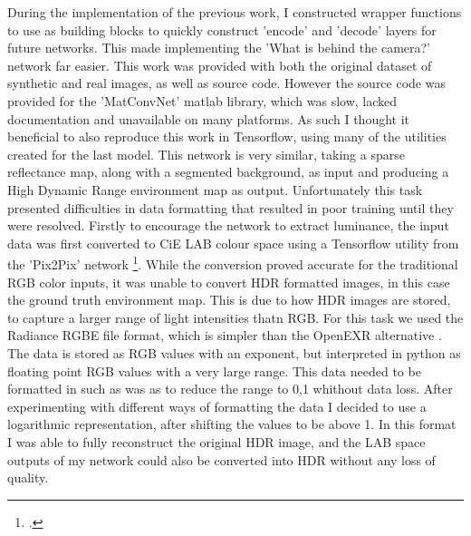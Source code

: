 \documentclass[ %
                    author={Gavin Parker},
                supervisor={Dr. Neill Campbell},
                    degree={MEng},
                     title={Deep Siamese Networks for Illumination Estimation from Stereo Images},
                  subtitle={},
                      type={research},
                      year={2018} ]{dissertation}
\begin{document}
\newline
During the implementation of the previous work, I constructed wrapper functions to use as building blocks to quickly construct 'encode' and 'decode' layers for future networks. This made implementing the 'What is behind the camera?' network far easier. This work was provided with both the original dataset of synthetic and real images, as well as source code. However the source code was provided for the 'MatConvNet' matlab library, which was slow, lacked documentation and unavailable on many platforms. As such I thought it beneficial to also reproduce this work in Tensorflow, using many of the utilities created for the last model. This network is very similar, taking a sparse reflectance map, along with a segmented background, as input and producing a High Dynamic Range environment map as output.
\newline
Unfortunately this task presented difficulties in data formatting that resulted in poor training until they were resolved. Firstly to encourage the network to extract luminance, the input data was first converted to CiE LAB colour space using a Tensorflow utility from the 'Pix2Pix' network \footcite{https://github.com/affinelayer/pix2pix-tensorflow/blob/master/pix2pix.py}. While the conversion proved accurate for the traditional RGB color inputs, it was unable to convert HDR formatted images, in this case the ground truth environment map. This is due to how HDR images are stored, to capture a larger range of light intensities thatn RGB. For this task we used the Radiance RGBE file format, which is simpler than the OpenEXR alternative . The data is stored as RGB values with an exponent, but interpreted in python as floating point RGB values with a very large range. This data needed to be formatted in such as was as to reduce the range to 0,1 whithout data loss. After experimenting with different ways of formatting the data I decided to use a logarithmic representation, after shifting the values to be above 1. In this format I was able to fully reconstruct the original HDR image, and the LAB space outputs of my network could also be converted into HDR without any loss of quality.
\newline
\end{document}
